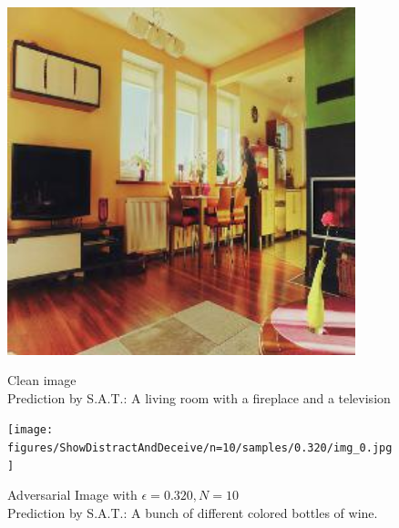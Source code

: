 \begin{figure}[ht]
    \centering
    \begin{minipage}{0.45\textwidth}
        \centering
        \includegraphics[width=0.9\textwidth]{figures/ShowDistractAndDeceive/n=10/samples/0.000/img_0.jpg} %
        \caption*{Clean image\\Prediction by S.A.T.: A living room with a fireplace and a television}
    \end{minipage}\hfill
    \begin{minipage}{0.45\textwidth}
        \centering
        \texttt{[image: figures/ShowDistractAndDeceive/n=10/samples/0.320/img\_0.jpg]} %
        \caption*{Adversarial Image with $\epsilon=0.320, N=10$\\Prediction by S.A.T.: A bunch of different colored bottles of wine.}
    \end{minipage}
\end{figure}

